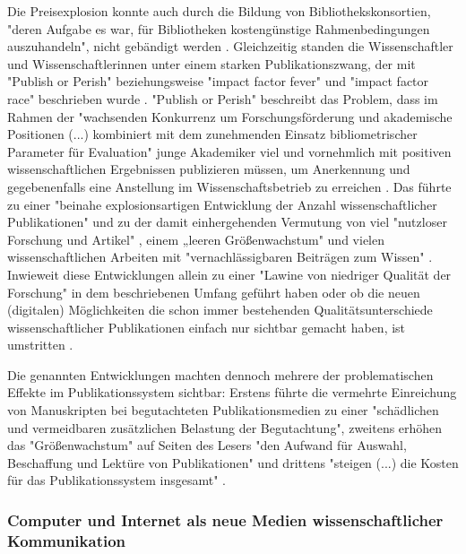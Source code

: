 Die Preisexplosion konnte auch durch die Bildung von Bibliothekskonsortien, "deren Aufgabe es war, für Bibliotheken kostengünstige Rahmenbedingungen auszuhandeln", nicht gebändigt werden \cite{Fladung_2003} \cite{Brintzinger_2010}. Gleichzeitig standen die Wissenschaftler und Wissenschaftlerinnen unter einem starken Publikationszwang, der mit "Publish or Perish" \cite{Clapham_2005} beziehungsweise "impact factor fever" \cite{Cherubini_2008} und "impact factor race" \cite{Brischoux_2009} beschrieben wurde \cite{Offhaus_2012}. "Publish or Perish" beschreibt das Problem, dass im Rahmen der "wachsenden Konkurrenz um Forschungsförderung und akademische Positionen (...) kombiniert mit dem zunehmenden Einsatz bibliometrischer Parameter für Evaluation" \cite{Fanelli_2010} junge Akademiker viel und vornehmlich mit positiven wissenschaftlichen Ergebnissen publizieren müssen, um Anerkennung und gegebenenfalls eine Anstellung im Wissenschaftsbetrieb zu erreichen \cite{Pscheida_2010} \cite{Beasley_2005} \cite{Hamilton_1990}. Das führte zu einer "beinahe explosionsartigen Entwicklung der Anzahl wissenschaftlicher Publikationen" \cite{Bortz_2006a} und zu der damit einhergehenden Vermutung von viel "nutzloser Forschung und Artikel" \cite{Smith_1990}, einem „leeren Größenwachstum" \cite[:34]{BBAW_2015} und vielen wissenschaftlichen Arbeiten mit "vernachlässigbaren Beiträgen zum Wissen" \cite{Hamilton_1990}. Inwieweit diese Entwicklungen allein zu einer "Lawine von niedriger Qualität der Forschung" \cite{Bauerlein_2010} in dem beschriebenen Umfang geführt haben oder ob die neuen (digitalen) Möglichkeiten die schon immer bestehenden Qualitätsunterschiede wissenschaftlicher Publikationen einfach nur sichtbar gemacht haben, ist umstritten \cite{Rekdal_2014}.

Die genannten Entwicklungen machten dennoch mehrere der problematischen Effekte im Publikationssystem sichtbar: Erstens führte die vermehrte Einreichung von Manuskripten bei begutachteten Publikationsmedien zu einer "schädlichen und vermeidbaren zusätzlichen Belastung der Begutachtung", zweitens erhöhen das "Größenwachstum" auf Seiten des Lesers "den Aufwand für Auswahl, Beschaffung und Lektüre von Publikationen" und drittens "steigen (...) die Kosten für das Publikationssystem insgesamt" \cite[:34]{BBAW_2015}.

\subsubsection{Computer und Internet als neue Medien wissenschaftlicher Kommunikation}

